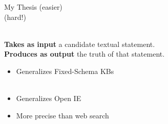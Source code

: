 \begin{frame}{My Thesis}
 (easier) \\
 (hard!)  \\
\vspace{2ex}
\pause

 \\
\hspace{2ex}\textbf{Takes as input} a candidate textual statement. \\
\hspace{2ex}\textbf{Produces as output} the truth of that statement. \\
\vspace{1ex}
\pause

\begin{itemize}
\item Generalizes Fixed-Schema KBs \\
       \\
\pause
\item Generalizes Open IE \\
\pause
\item More precise than web search \\
\end{itemize}




\end{frame}
